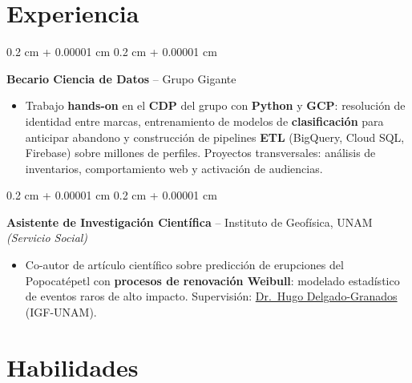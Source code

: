 \documentclass[10pt, letterpaper]{article}
\newenvironment{highlights}{
    \begin{itemize}[
        topsep=0.02 cm,
        parsep=0.05 cm,
        partopsep=0pt,
        itemsep=0pt,
        leftmargin=0.4 cm + 10pt
    ]
}{
    \end{itemize}
}
\newenvironment{onecolentry}{
    \begin{adjustwidth}{
        0.2 cm + 0.00001 cm
    }{
        0.2 cm + 0.00001 cm
    }
}{
    \end{adjustwidth}
}
\let\hrefWithoutArrow\href
\renewcommand{\href}[2]{\hrefWithoutArrow{#1}{\ifthenelse{\equal{#2}{}}{ }{#2 }\raisebox{.15ex}{\footnotesize \faExternalLink*}}}
\begin{document}
    \section{Experiencia}

        \begin{onecolentry}
            \textbf{Becario Ciencia de Datos} -- Grupo Gigante
            \begin{highlights}
                \item Trabajo \textbf{hands-on} en el \textbf{CDP} del grupo con \textbf{Python} y \textbf{GCP}: resolución de identidad entre marcas, entrenamiento de modelos de \textbf{clasificación} para anticipar abandono y construcción de pipelines \textbf{ETL} (BigQuery, Cloud SQL, Firebase) sobre millones de perfiles. Proyectos transversales: análisis de inventarios, comportamiento web y activación de audiencias.
            \end{highlights}
            \end{onecolentry}

        \vspace{0.02 cm}

        \begin{onecolentry}
            \textbf{Asistente de Investigación Científica} -- Instituto de Geofísica, UNAM \textit{(Servicio Social)}
            \begin{highlights}
                \item Co-autor de artículo científico sobre predicción de erupciones del Popocatépetl con \textbf{procesos de renovación Weibull}: modelado estadístico de eventos raros de alto impacto. Supervisión: \hrefWithoutArrow{https://scholar.google.com/citations?user=lDD0DZQAAAAJ}{Dr.\ Hugo Delgado-Granados} (IGF-UNAM).
            \end{highlights}
            \end{onecolentry}


    \section{Habilidades}
\end{document}
